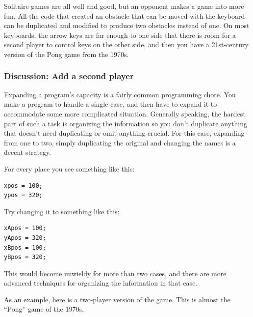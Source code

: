 \documentclass[11pt]{article}
\begin{document}
Solitaire games are all well and good, but an opponent makes a game
into more fun.  All the code that created an obstacle that can be
moved with the keyboard can be duplicated and modified to produce two
obstacles instead of one.  On most keyboards, the arrow keys are far
enough to one side that there is room for a second player to control
keys on the other side, and then you have a 21st-century version of
the Pong game from the 1970s.

\subsubsection{Discussion: Add a second player}

Expanding a program's capacity is a fairly common programming chore.
You make a program to handle a single case, and then have to expand it
to accommodate some more complicated situation.  Generally speaking,
the hardest part of such a task is organizing the information so you
don't duplicate anything that doesn't need duplicating or omit
anything crucial.  For this case, expanding from one to two, simply
duplicating the original and changing the names is a decent strategy.

For every place you see something like this:

\begin{verbatim}
xpos = 100;
ypos = 320;
\end{verbatim}

Try changing it to something like this:

\begin{verbatim}
xApos = 100;
yApos = 320;
xBpos = 100;
yBpos = 320;
\end{verbatim}

This would become unwieldy for more than two cases, and there are more
advanced techniques for organizing the information in that case.

As an example, here is a two-player version of the game.  This is
almost the ``Pong'' game of the 1970s.
\end{document}
